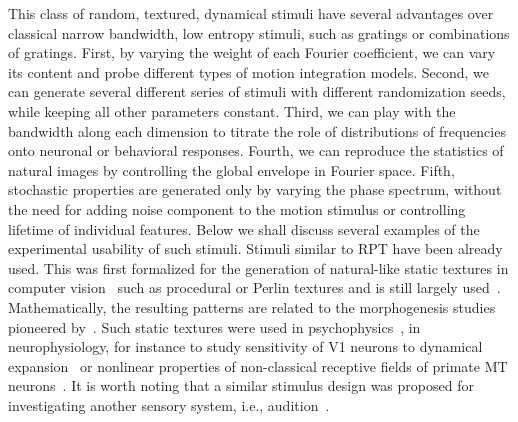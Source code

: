 \documentclass[a4paper,11pt]{article}%
\begin{document}
This class of random, textured, dynamical stimuli have several advantages over classical narrow bandwidth, low entropy stimuli, such as gratings or combinations of gratings. First, by varying the weight of each Fourier coefficient, we can vary its content and probe different types of motion integration models. Second, we can generate several different series of stimuli with different randomization seeds, while keeping all other parameters constant. Third, we can play with the bandwidth along each dimension to titrate the role of distributions of frequencies onto neuronal or behavioral responses. Fourth, we can reproduce the statistics of natural images by controlling the global envelope in Fourier space. Fifth, stochastic properties are generated only by varying the phase spectrum, without the need for adding noise component to the motion stimulus or controlling lifetime of individual features. Below we shall discuss several examples of the experimental usability of such stimuli. Stimuli similar to RPT have been already used. This was first formalized for the generation of natural-like static textures in computer vision~\citep{Lewis84} such as procedural or Perlin textures and is still largely used~\citep{Lagae09}. Mathematically, the resulting patterns are related to the morphogenesis studies pioneered by~\citep{Turing52}. Such static textures were used in psychophysics~\citep{Essock09}, in neurophysiology, for instance to study sensitivity of V1 neurons to dynamical expansion~\citep{Wang11} or nonlinear properties of non-classical receptive fields of primate MT neurons~\citep{Solomon10}. It is worth noting that a similar stimulus design was proposed for investigating another sensory system, i.e., audition~\citep{Rieke95,Klein00}. %

\end{document}
